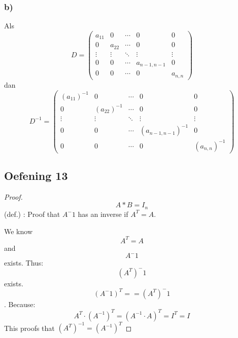 \documentclass[lineaire_algebra_oplossingen.tex]{subfiles}
\begin{document}
\subsubsection*{b)}
Als
$$ D = \begin{pmatrix}
a_{11} & 0 & \cdots & 0 & 0\\
0 & a_{22} & \cdots & 0 & 0\\
\vdots & \vdots & \ddots & \vdots & \vdots\\
0 & 0 & \cdots & a_{n-1,n-1} & 0 \\
0 & 0 & \cdots & 0 & a_{n,n}
\end{pmatrix}
$$
dan
$$ D^{-1} = \begin{pmatrix}
(a_{11})^{-1} & 0 & \cdots & 0 & 0\\
0 & (a_{22})^{-1} & \cdots & 0 & 0\\
\vdots & \vdots & \ddots & \vdots & \vdots\\
0 & 0 & \cdots & (a_{n-1,n-1})^{-1} & 0 \\
0 & 0 & \cdots & 0 & (a_{n,n})^{-1}
\end{pmatrix}
$$

\subsection{Oefening 13}

\begin{proof}

\[A*B = I_{n} \] (def.) : Proof that $A^-1$ has an inverse if $ A^T = A $.

We know \[A^T = A \] and \[ A^-1 \] exists.
Thus: \[(A^T)^-1 \] exists.
\[ (A^-1)^T ==  (A^T)^-1 \].
Because:
$$A^T\cdot (A^{-1})^T = (A^{-1}\cdot A)^T = I^T = I$$
This proofs that $(A^T)^{-1} = (A^{-1})^T$
\end{proof}
\end{document}
